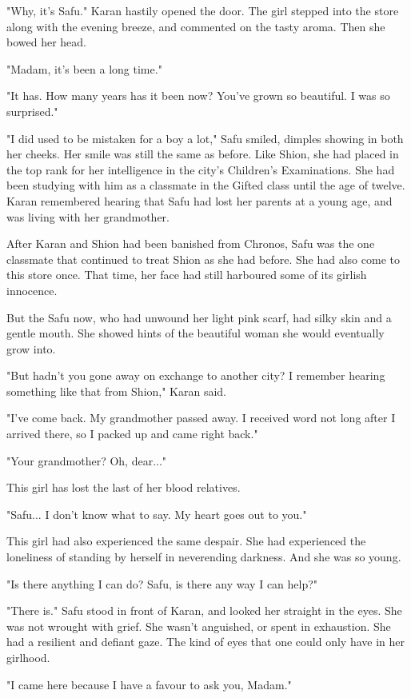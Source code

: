 "Why, it's Safu." Karan hastily opened the door. The girl stepped into
the store along with the evening breeze, and commented on the tasty
aroma. Then she bowed her head.

"Madam, it's been a long time."

"It has. How many years has it been now? You've grown so beautiful. I
was so surprised."

"I did used to be mistaken for a boy a lot," Safu smiled, dimples
showing in both her cheeks. Her smile was still the same as before. Like
Shion, she had placed in the top rank for her intelligence in the city's
Children's Examinations. She had been studying with him as a classmate
in the Gifted class until the age of twelve. Karan remembered hearing
that Safu had lost her parents at a young age, and was living with her
grandmother.

After Karan and Shion had been banished from Chronos, Safu was the one
classmate that continued to treat Shion as she had before. She had also
come to this store once. That time, her face had still harboured some of
its girlish innocence.

But the Safu now, who had unwound her light pink scarf, had silky skin
and a gentle mouth. She showed hints of the beautiful woman she would
eventually grow into.

"But hadn't you gone away on exchange to another city? I remember
hearing something like that from Shion," Karan said.

"I've come back. My grandmother passed away. I received word not long
after I arrived there, so I packed up and came right back."

"Your grandmother? Oh, dear..."

This girl has lost the last of her blood relatives.

"Safu... I don't know what to say. My heart goes out to you."

This girl had also experienced the same despair. She had experienced the
loneliness of standing by herself in neverending darkness. And she was
so young.

"Is there anything I can do? Safu, is there any way I can help?"

"There is." Safu stood in front of Karan, and looked her straight in the
eyes. She was not wrought with grief. She wasn't anguished, or spent in
exhaustion. She had a resilient and defiant gaze. The kind of eyes that
one could only have in her girlhood.

"I came here because I have a favour to ask you, Madam."

